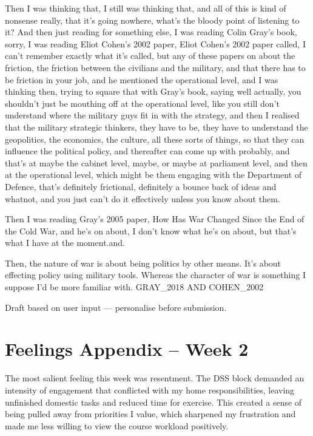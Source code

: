 Then I was thinking that, I still was thinking that, and all of this is kind of nonsense really, that it’s going nowhere, what’s the bloody point of listening to it? And then just reading for something else, I was reading Colin Gray’s book, sorry, I was reading Eliot Cohen’s 2002 paper, Eliot Cohen’s 2002 paper called, I can’t remember exactly what it’s called, but any of these papers on about the friction, the friction between the civilians and the military, and that there has to be friction in your job, and he mentioned the operational level, and I was thinking then, trying to square that with Gray’s book, saying well actually, you shouldn’t just be mouthing off at the operational level, like you still don’t understand where the military guys fit in with the strategy, and then I realised that the military strategic thinkers, they have to be, they have to understand the geopolitics, the economics, the culture, all these sorts of things, so that they can influence the political policy, and thereafter can come up with probably, and that’s at maybe the cabinet level, maybe, or maybe at parliament level, and then at the operational level, which might be them engaging with the Department of Defence, that’s definitely frictional, definitely a bounce back of ideas and whatnot, and you just can’t do it effectively unless you know about them.

Then I was reading Gray’s 2005 paper, How Has War Changed Since the End of the Cold War, and he’s on about, I don’t know what he’s on about, but that’s what I have at the moment.and.

Then, the nature of war is about being politics by other means. It's about effecting policy using military tools. Whereas the character of war is something I suppose I'd be more familiar with. GRAY_2018 AND COHEN_2002	

 Draft based on user input — personalise before submission.

\chapter*{Feelings Appendix – Week 2}

The most salient feeling this week was resentment. The DSS block demanded an intensity of engagement that conflicted with my home responsibilities, leaving unfinished domestic tasks and reduced time for exercise. This created a sense of being pulled away from priorities I value, which sharpened my frustration and made me less willing to view the course workload positively.

